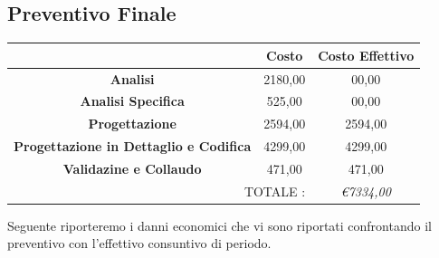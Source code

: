 \documentclass[12pt,a4paper,titlepage]{article}
\begin{document}
\subsection{Preventivo Finale}
{\renewcommand\arraystretch{1.2} %
\begin{tabular}{|c|c|c|}
	\hline 
	& \textbf{Costo} & \textbf{Costo Effettivo} \\ 
	\hline 
	\textbf{Analisi} & 2180,00 & 00,00 \\ 
	\hline 
	\textbf{Analisi Specifica} & 525,00 & 00,00 \\ 
	\hline 
	\textbf{Progettazione} & 2594,00 & 2594,00 \\ 
	\hline 
	\textbf{Progettazione in Dettaglio e Codifica} & 4299,00 & 4299,00 \\ 
	\hline 
	\textbf{Validazine e Collaudo} & 471,00 & 471,00 \\ 
	\hline 
	\multicolumn{2}{r|}{TOTALE :} & \textit{\euro 7334,00 } \\ 
\end{tabular}
} 
\vspace{0.5cm}

Seguente riporteremo i danni economici che vi sono riportati confrontando il preventivo con l'effettivo consuntivo di periodo.
\end{document}
